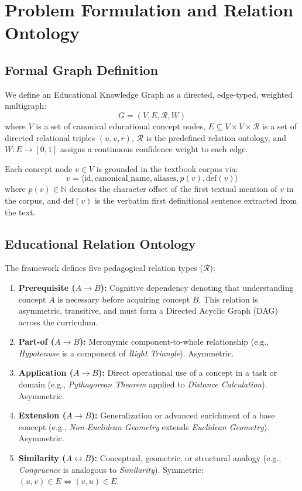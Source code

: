 \section{Problem Formulation and Relation Ontology}
\label{sec:problem_formulation}

\subsection{Formal Graph Definition}
We define an Educational Knowledge Graph as a directed, edge-typed, weighted multigraph:
\begin{equation}
G = (V, E, \mathcal{R}, W)
\end{equation}
where $V$ is a set of canonical educational concept nodes, $E \subseteq V \times V \times \mathcal{R}$ is a set of directed relational triples $(u, v, r)$, $\mathcal{R}$ is the predefined relation ontology, and $W: E \to [0, 1]$ assigns a continuous confidence weight to each edge.

Each concept node $v \in V$ is grounded in the textbook corpus via:
\begin{equation}
v = \langle \text{id}, \text{canonical\_name}, \text{aliases}, p(v), \text{def}(v) \rangle
\end{equation}
where $p(v) \in \mathbb{N}$ denotes the character offset of the first textual mention of $v$ in the corpus, and $\text{def}(v)$ is the verbatim first definitional sentence extracted from the text.

\subsection{Educational Relation Ontology}
The framework defines five pedagogical relation types ($\mathcal{R}$):
\begin{enumerate}[leftmargin=*]
    \item \textbf{Prerequisite ($A \to B$):} Cognitive dependency denoting that understanding concept $A$ is necessary before acquiring concept $B$. This relation is asymmetric, transitive, and must form a Directed Acyclic Graph (DAG) across the curriculum.
    \item \textbf{Part-of ($A \to B$):} Meronymic component-to-whole relationship (e.g., \textit{Hypotenuse} is a component of \textit{Right Triangle}). Asymmetric.
    \item \textbf{Application ($A \to B$):} Direct operational use of a concept in a task or domain (e.g., \textit{Pythagorean Theorem} applied to \textit{Distance Calculation}). Asymmetric.
    \item \textbf{Extension ($A \to B$):} Generalization or advanced enrichment of a base concept (e.g., \textit{Non-Euclidean Geometry} extends \textit{Euclidean Geometry}). Asymmetric.
    \item \textbf{Similarity ($A \leftrightarrow B$):} Conceptual, geometric, or structural analogy (e.g., \textit{Congruence} is analogous to \textit{Similarity}). Symmetric: $(u, v) \in E \iff (v, u) \in E$.
\end{enumerate}

